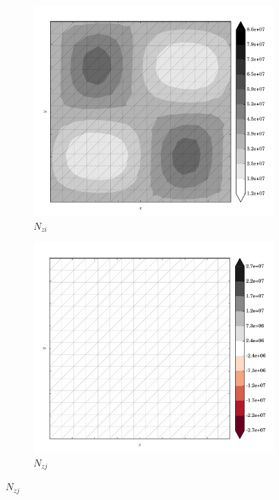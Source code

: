 \begin{figure}
  \begin{subfigure}[b]{0.3\linewidth}
    \includegraphics[width=\linewidth]{images/stress_balance/BP/N_zi.pdf}
  \caption{$N_{zi}$}
  \label{bp_N_zi}
  \end{subfigure}
  \begin{subfigure}[b]{0.3\linewidth}
    \includegraphics[width=\linewidth]{images/stress_balance/BP/N_zj.pdf}
  \caption{$N_{zj}$}
  \label{bp_N_zj}
  \end{subfigure}

\end{figure}
